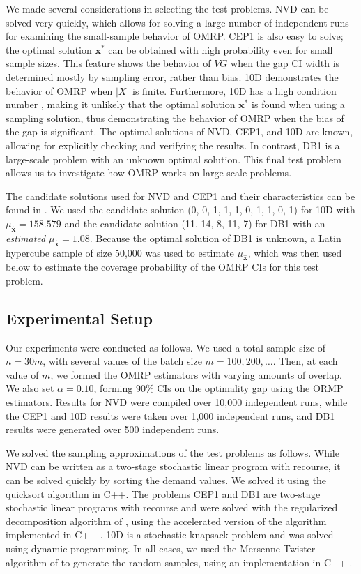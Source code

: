 \documentclass[12pt]{article}
\newcommand{\x}{\mathbf{x}}
\newcommand{\xh}{{\hat{\x}}}
\newcommand{\xs}{\x^*}
\begin{document}
We made several considerations in selecting the test problems.
NVD can be solved very quickly, which allows for solving a large number of independent runs for examining the small-sample behavior of OMRP.
CEP1 is also easy to solve; the optimal solution $\xs$ can be obtained with high probability even for small sample sizes.
This feature shows the behavior of $VG$ when the gap CI width is determined mostly by sampling error, rather than bias.
10D demonstrates the behavior of OMRP when $|X|$ is finite.
Furthermore, 10D has a high condition number \citep{kleywegt2002sample}, making it unlikely that the optimal solution $\xs$ is found when using a sampling solution, thus demonstrating the behavior of OMRP when the bias of the gap is significant.
The optimal solutions of NVD, CEP1, and 10D are known, allowing for explicitly checking and verifying the results.
In contrast, DB1 is a large-scale problem with an unknown optimal solution.
This final test problem allows us to investigate how OMRP works on large-scale problems.


The candidate solutions used for NVD and CEP1 and their characteristics can be found in \citep{Bayraksan2006}.
We used the candidate solution (0, 0, 1, 1, 1, 0, 1, 1, 0, 1) for 10D with $\mu_{\xh} = 158.579$ and the candidate solution (11, 14, 8, 11, 7) for DB1 with an {\it estimated} $\mu_{\xh} = 1.08$. 
Because the optimal solution of DB1 is unknown, a Latin hypercube sample of size 50,000 was used to estimate $\mu_{\xh}$, which was then used below to estimate the coverage probability of the OMRP CIs for this test problem.


\subsection{Experimental Setup}
\label{ssec:expS}


Our experiments were conducted as follows. 
We used a total sample size of $n = 30 m$, with several values of the batch size $m=100, 200, \ldots$. 
Then, at each value of $m$, we formed the OMRP estimators with varying amounts of overlap. 
We also set $\alpha=0.10$, forming 90\% CIs on the optimality gap using the ORMP estimators. 
Results for NVD were compiled over 10,000 independent runs, while the CEP1 and 10D results were taken over 1,000 independent runs, and DB1 results were generated over 500 independent runs.

We solved the sampling approximations of the test problems as follows.
While NVD can be written as a two-stage stochastic linear program with recourse, it can be solved quickly by sorting the demand values. 
We solved it using the quicksort algorithm in C++. 
The problems CEP1 and DB1 are two-stage stochastic linear programs with recourse and were solved with the regularized decomposition algorithm of \citet{ruszczynski1986regularized}, using the accelerated version of the algorithm implemented in C++ \citep{ruszczynski1997accelerating}. 
10D is a stochastic knapsack problem and was solved using dynamic programming.  
In all cases, we used the Mersenne Twister algorithm of \citet{matsumoto_nishimura_98} to generate the random samples, using an implementation in C++ \citep{wagner_twister_09}.
\end{document}
